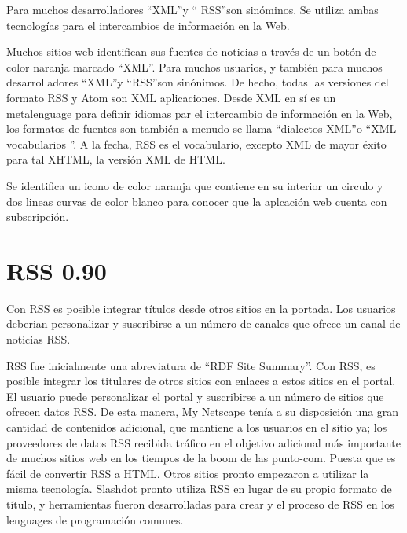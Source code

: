 Para muchos desarrolladores \textquotedblleft XML\textquotedblright y \textquotedblleft
RSS\textquotedblright son sin\'{o}minos. Se utiliza ambas tecnolog\'{i}as para el 
intercambios de informaci\'{o}n en la Web.

Muchos sitios web identifican sus fuentes de noticias a trav\'{e}s de un bot\'{o}n
de color naranja marcado \textquotedblleft XML\textquotedblright. Para muchos usuarios,
y tambi\'{e}n para muchos desarrolladores \textquotedblleft XML\textquotedblright  y
\textquotedblleft RSS\textquotedblright son sin\'{o}nimos. De hecho, todas las versiones
del formato RSS y Atom son XML aplicaciones. Desde XML en s\'{i} es un metalenguage para
definir idiomas par el intercambio de informaci\'{o}n en la Web, los formatos de fuentes
son tambi\'{e}n a menudo se llama \textquotedblleft dialectos XML\textquotedblright  o 
\textquotedblleft XML vocabularios \textquotedblright. A la fecha, RSS es el vocabulario, 
excepto XML de mayor \'{e}xito para tal XHTML, la versi\'{o}n XML de HTML.\cite{wittenbrink2005rss}

Se identifica un icono de color naranja que contiene en su interior un circulo y dos
lineas curvas de color blanco para conocer que la aplcaci\'{o}n web cuenta con 
subscripci\'{o}n.

\section{RSS 0.90}

Con RSS es posible integrar t\'{i}tulos desde otros sitios en la portada. Los 
usuarios deberian personalizar y suscribirse a un n\'{u}mero de canales que 
ofrece un canal de noticias RSS.


RSS fue inicialmente una abreviatura de \textquotedblleft RDF Site Summary\textquotedblright.
Con RSS, es posible integrar los titulares de otros sitios con enlaces a estos sitios en el 
portal. El usuario puede personalizar el portal y suscribirse a un n\'{u}mero de sitios que
ofrecen datos RSS. De esta manera, My Netscape ten\'{i}a a su disposici\'{o}n una gran 
cantidad de contenidos adicional, que mantiene a los usuarios en el sitio ya; los proveedores
de datos RSS recibida tr\'{a}fico en el objetivo adicional m\'{a}s importante de muchos
sitios web en los tiempos de la boom de las punto-com. Puesta que es f\'{a}cil de convertir
RSS a HTML. Otros sitios pronto empezaron a utilizar la misma tecnolog\'{i}a. Slashdot pronto
utiliza RSS en lugar de su propio formato de t\'{i}tulo, y herramientas fueron desarrolladas
para crear y el proceso de RSS en los lenguages de programaci\'{o}n comunes.\cite{wittenbrink2005rss}


